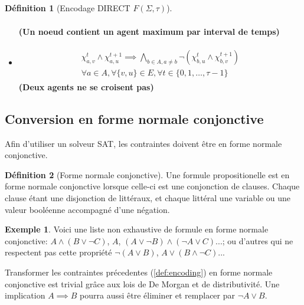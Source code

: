 \documentclass[french, 10pt, letterpaper]{article}
\theoremstyle{definition}
\newtheorem{definition}{Définition}[subsection]
\theoremstyle{proposition}
\theoremstyle{example}
\newtheorem{example}{Exemple}[definition]
\begin{document}
\begin{definition}[Encodage DIRECT $F(\Sigma, \tau)$]
\begin{itemize}
\begin{gather}
                \end{gather}
                \textbf{(Un noeud contient un agent maximum par interval de temps)}
            \item[] 
                \begin{gather}
                    \begin{split}
                        \chi_{a, v}^t \land \chi_{a, u}^{t+1} \implies \bigwedge_{b \in A, a \neq b} \lnot (\chi_{b, u}^t \land \chi_{b, v}^{t+1})
                        \\\forall a \in A, \forall \{v, u\} \in E, \forall t \in \{0, 1, \ldots, \tau-1\}
                    \end{split}
                \end{gather}
                \textbf{(Deux agents ne se croisent pas)}
        \end{itemize}
    \end{definition}

    \subsection{Conversion en forme normale conjonctive}
    \label{sec:cnf}

    Afin d'utiliser un solveur SAT, les contraintes doivent être en forme normale conjonctive.

    \begin{definition}[Forme normale conjonctive]
        Une formule propositionelle est en forme normale conjonctive lorsque celle-ci est une conjonction de clauses.
        Chaque clause étant une disjonction de littéraux, et chaque littéral une variable ou une valeur booléenne accompagné d'une négation. 
    \end{definition}

    \begin{example}
        Voici une liste non exhaustive de formule en forme normale conjonctive: $A \land (B \lor \lnot C)$, $A$, $(A \lor \lnot B) \land (\lnot A \lor C)$...; 
        ou d'autres qui ne respectent pas cette propriété $\lnot (A \lor B)$, $A \lor (B \land \lnot C)$... 
    \end{example}

    Transformer les contraintes précedentes (\ref{def:encoding}) en forme normale conjonctive est trivial grâce aux lois de De Morgan et de distributivité.
    Une implication $A \implies B$ pourra aussi être éliminer et remplacer par $\lnot A \lor B$.
\end{document}
